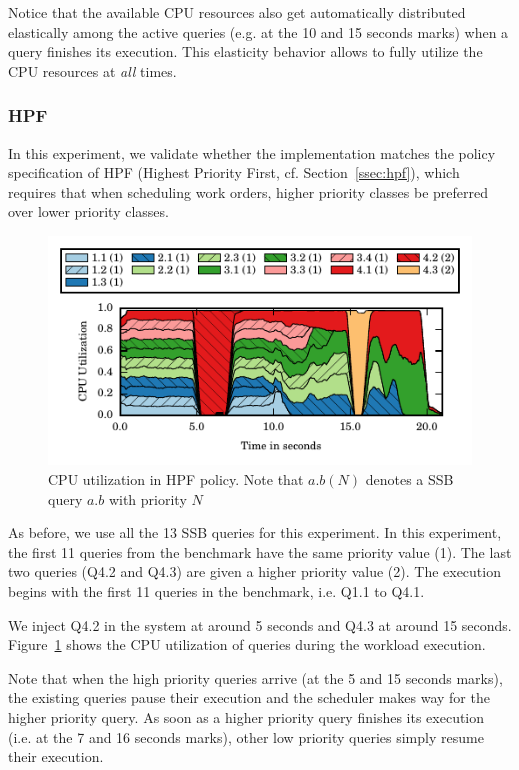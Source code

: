Notice that the available CPU resources also get automatically distributed elastically among the active 
queries (e.g. at the 10 and 15 seconds marks) when a query finishes its execution. 
This elasticity behavior allows \sys{} to fully utilize the CPU resources at \textit{all} times.
\subsubsection{HPF}
In this experiment, we validate whether the implementation matches the policy 
specification of HPF (Highest Priority First, cf. Section~\ref{ssec:hpf}),
which requires that when scheduling work orders, higher priority classes be 
preferred over lower priority classes. 

\begin{figure}[b]
	\centering
	\includegraphics[width=\columnwidth]{figures/ssb-hpf-all.pdf}
	\vspace{-2.5em}
	\caption{CPU utilization in HPF policy. Note that $a.b  (N)$ denotes a SSB query $a.b$ with priority $N$}
	\vspace{-1em}
	\label{fig:hpf-all}
\end{figure}

As before, we use all the 13 SSB queries for this experiment. 
In this experiment, the first 11 queries from the benchmark have the same priority value (1).
The last two queries (Q4.2 and Q4.3) are given a higher priority value (2). 
The execution begins with the first 11 queries in the benchmark, i.e. Q1.1 to Q4.1.

We inject Q4.2 in the system at around 5 seconds and Q4.3 at around 15 seconds.
Figure~\ref{fig:hpf-all} shows the CPU utilization of queries during the workload 
execution.

Note that when the high priority queries arrive (at the 5 and 15 seconds marks), the existing queries pause their execution and the scheduler makes way for the higher priority query.
As soon as a higher priority query finishes its execution (i.e. at the 7 and 16 seconds marks), other low priority queries simply resume their execution.

